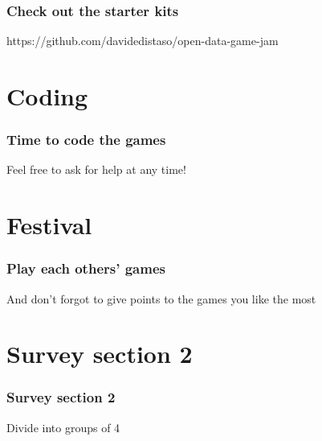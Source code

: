 \documentclass{beamer}
\begin{document}
\begin{frame}
\frametitle{Check out the starter kits}
https://github.com/davidedistaso/open-data-game-jam
\end{frame}

\section{Coding}
\begin{frame}
\frametitle{Time to code the games}
Feel free to ask for help at any time!
\begin{figure}

\end{figure}
\end{frame}

\section{Festival}
\begin{frame}
\frametitle{Play each others' games}
And don't forgot to give points to the games you like the most
\end{frame}

\section{Survey section 2}
\begin{frame}
\frametitle{Survey section 2}
Divide into groups of 4
\begin{figure}
\end{figure}
\end{frame}
\end{document}
